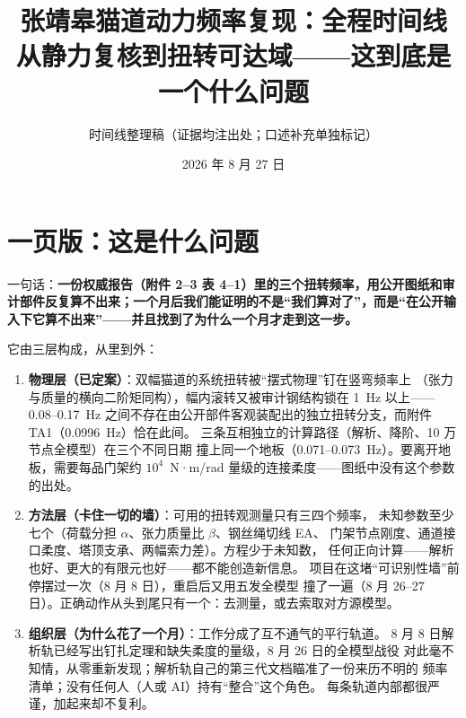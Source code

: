 \documentclass[11pt,a4paper]{ctexart}
\title{\bfseries 张靖皋猫道动力频率复现：全程时间线\\
\large 从静力复核到扭转可达域——这到底是一个什么问题}
\author{时间线整理稿（证据均注出处；口述补充单独标记）}
\date{2026 年 8 月 27 日}
\begin{document}
\maketitle

\noindent{}

\vspace{0.5em}
\section*{一页版：这是什么问题}

一句话：\textbf{一份权威报告（附件 2--3 表 4--1）里的三个扭转频率，用公开图纸和审计部件反复算不出来；一个月后我们能证明的不是``我们算对了''，而是``在公开输入下它算不出来''——并且找到了为什么一个月才走到这一步。}

它由三层构成，从里到外：

\begin{enumerate}
  \item \textbf{物理层（已定案）}：双幅猫道的系统扭转被``摆式物理''钉在竖弯频率上
        （张力与质量的横向二阶矩同构），幅内滚转又被审计钢结构锁在 1~Hz 以上——
        0.08--0.17~Hz 之间不存在由公开部件客观装配出的独立扭转分支，而附件 TA1（0.0996~Hz）恰在此间。
        三条互相独立的计算路径（解析、降阶、10 万节点全模型）在三个不同日期
        撞上同一个地板（0.071--0.073~Hz）。要离开地板，需要每品门架约
        $10^4$~N·m/rad 量级的连接柔度——图纸中没有这个参数的出处。
  \item \textbf{方法层（卡住一切的墙）}：可用的扭转观测量只有三四个频率，
        未知参数至少七个（荷载分担 $\alpha$、张力质量比 $\beta$、钢丝绳切线 EA、
        门架节点刚度、通道接口柔度、塔顶支承、两幅索力差）。方程少于未知数，
        任何正向计算——解析也好、更大的有限元也好——都不能创造新信息。
        项目在这堵``可识别性墙''前停摆过一次（8 月 8 日），重启后又用五发全模型
        撞了一遍（8 月 26--27 日）。正确动作从头到尾只有一个：去测量，或去索取对方源模型。
  \item \textbf{组织层（为什么花了一个月）}：工作分成了互不通气的平行轨道。
        8 月 8 日解析轨已经写出钉扎定理和缺失柔度的量级，8 月 26 日的全模型战役
        对此毫不知情，从零重新发现；解析轨自己的第三代文档瞄准了一份来历不明的
        频率清单；没有任何人（人或 AI）持有``整合''这个角色。
        每条轨道内部都很严谨，加起来却不复利。
\end{enumerate}
\end{document}
